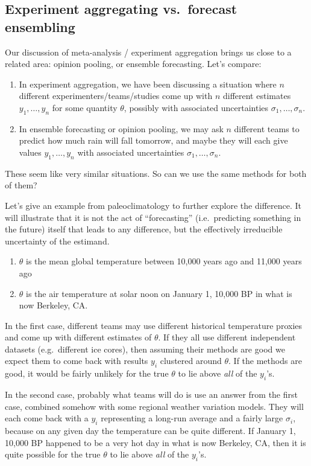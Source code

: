 \documentclass[letterpaper,12pt]{article}
\begin{document}
\subsection{Experiment aggregating vs.~forecast ensembling}

Our discussion of meta-analysis / experiment aggregation brings us close to a related area: opinion pooling, or ensemble forecasting. Let's compare:

\begin{enumerate}
\item
  In experiment aggregation, we have been discussing a situation where $n$ different experimenters/teams/studies come up with $n$ different estimates $y_1,\ldots,y_n$ for some quantity $\theta$, possibly with associated uncertainties $\sigma_1,\ldots,\sigma_n$.
\item
  In ensemble forecasting or opinion pooling, we may ask $n$ different teams to predict how much rain will fall tomorrow, and maybe they will each give values $y_1,\ldots,y_n$ with associated uncertainties $\sigma_1,\ldots,\sigma_n$.
\end{enumerate}

These seem like very similar situations. So can we use the same methods for both of them?

Let's give an example from paleoclimatology to further explore the difference. It will illustrate that it is not the act of ``forecasting'' (i.e.~predicting something in the future) itself that leads to any difference, but the effectively irreducible uncertainty of the estimand.

\begin{enumerate}
\item
  $\theta$ is the mean global temperature between 10,000 years ago and 11,000 years ago
\item
  $\theta$ is the air temperature at solar noon on January 1, 10,000 BP in what is now Berkeley, CA.
\end{enumerate}

In the first case, different teams may use different historical temperature proxies and come up with different estimates of $\theta$. If they all use different independent datasets (e.g.~different ice cores), then assuming their methods are good we expect them to come back with results $y_i$ clustered around $\theta$. If the methods are good, it would be fairly unlikely for the true $\theta$ to lie above \emph{all} of the $y_i$'s.

In the second case, probably what teams will do is use an answer from the first case, combined somehow with some regional weather variation models. They will each come back with a $y_i$ representing a long-run average and a fairly large $\sigma_i$, because on any given day the temperature can be quite different. If January 1, 10,000 BP happened to be a very hot day in what is now Berkeley, CA, then it is quite possible for the true $\theta$ to lie above \emph{all} of the $y_i$'s.
\end{document}
